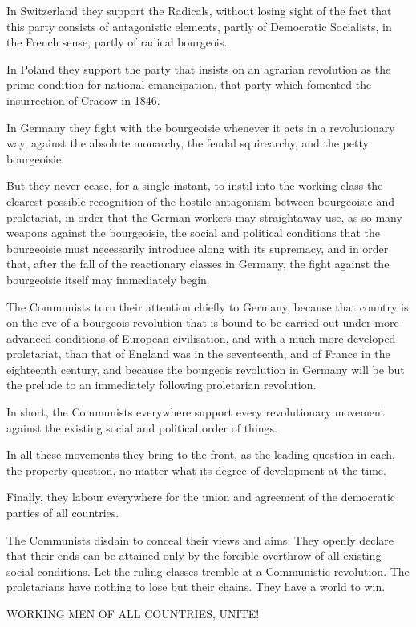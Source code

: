 \documentclass[11pt]{book}
\begin{document}
In Switzerland they support the Radicals, without losing sight
of the fact that this party consists of antagonistic elements,
partly of Democratic Socialists, in the French sense, partly of
radical bourgeois.

In Poland they support the party that insists on an agrarian
revolution as the prime condition for national emancipation, that
party which fomented the insurrection of Cracow in 1846.

In Germany they fight with the bourgeoisie whenever it acts in a
revolutionary way, against the absolute monarchy, the feudal
squirearchy, and the petty bourgeoisie.

But they never cease, for a single instant, to instil into the
working class the clearest possible recognition of the hostile
antagonism between bourgeoisie and proletariat, in order that the
German workers may straightaway use, as so many weapons against
the bourgeoisie, the social and political conditions that the
bourgeoisie must necessarily introduce along with its supremacy,
and in order that, after the fall of the reactionary classes in
Germany, the fight against the bourgeoisie itself may immediately
begin.

The Communists turn their attention chiefly to Germany, because
that country is on the eve of a bourgeois revolution that
is bound to be carried out under more advanced conditions
of European civilisation, and with a much more developed
proletariat, than that of England was in the seventeenth, and of
France in the eighteenth century, and because the bourgeois
revolution in Germany will be but the prelude to an immediately
following proletarian revolution.

In short, the Communists everywhere support every revolutionary
movement against the existing social and political order of
things.

In all these movements they bring to the front, as the leading
question in each, the property question, no matter what its
degree of development at the time.

Finally, they labour everywhere for the union and agreement of
the democratic parties of all countries.

The Communists disdain to conceal their views and aims.
They openly declare that their ends can be attained only by
the forcible overthrow of all existing social conditions.
Let the ruling classes tremble at a Communistic revolution.
The proletarians have nothing to lose but their chains.
They have a world to win.


           WORKING MEN OF ALL COUNTRIES, UNITE!
\end{document}
